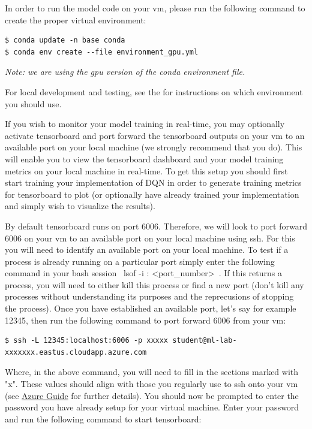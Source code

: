 In order to run the model code on your vm, please run the following command to create the proper virtual environment:

\begin{lstlisting}
$ conda update -n base conda
$ conda env create --file environment_gpu.yml
\end{lstlisting}

\textit{Note: we are using the gpu version of the conda environment file.}

For local development and testing, see the  for instructions on which environment you should use.

If you wish to monitor your model training in real-time, you may optionally activate tensorboard and port forward the tensorboard outputs on your vm to an available port on your local machine (we strongly recommend that you do). This will enable you to view the tensorboard dashboard and your model training metrics on your local machine in real-time. To get this setup you should first start training your implementation of DQN in order to generate training metrics for tensorboard to plot (or optionally have already trained your implementation and simply wish to visualize the results). 

By default tensorboard runs on port 6006. Therefore, we will look to port forward 6006 on your vm to an available port on your local machine using ssh. For this you will need to identify an available port on your local machine. To test if a process is already running on a particular port simply enter the following command in your bash session ~lsof -i : <port_number>~. If this returns a process, you will need to either kill this process or find a new port (don't kill any processes without understanding its purposes and the reprecusions of stopping the process). Once you have established an available port, let's say for example 12345, then run the following command to port forward 6006 from your vm:

\begin{lstlisting}
$ ssh -L 12345:localhost:6006 -p xxxxx student@ml-lab-xxxxxxx.eastus.cloudapp.azure.com
\end{lstlisting}  

Where, in the above command, you will need to fill in the sections marked with "x". These values should align with those you regularly use to ssh onto your vm (see \href{https://github.com/scpd-proed/XCS234-Handouts/blob/main/Azure/Azure%20Guide.pdf}{Azure Guide} for further details). You should now be prompted to enter the password you have already setup for your virtual machine. Enter your password and run the following command to start tensorboard:

